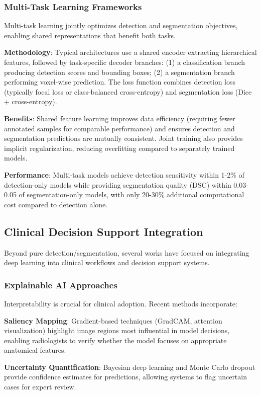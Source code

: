 \documentclass[conference]{IEEEtran}
\begin{document}
\subsubsection{Multi-Task Learning Frameworks}
Multi-task learning jointly optimizes detection and segmentation objectives, enabling shared representations that benefit both tasks.

\textbf{Methodology}: Typical architectures use a shared encoder extracting hierarchical features, followed by task-specific decoder branches: (1) a classification branch producing detection scores and bounding boxes; (2) a segmentation branch performing voxel-wise prediction. The loss function combines detection loss (typically focal loss or class-balanced cross-entropy) and segmentation loss (Dice + cross-entropy).

\textbf{Benefits}: Shared feature learning improves data efficiency (requiring fewer annotated samples for comparable performance) and ensures detection and segmentation predictions are mutually consistent. Joint training also provides implicit regularization, reducing overfitting compared to separately trained models.

\textbf{Performance}: Multi-task models achieve detection sensitivity within 1-2\% of detection-only models while providing segmentation quality (DSC) within 0.03-0.05 of segmentation-only models, with only 20-30\% additional computational cost compared to detection alone.

\subsection{Clinical Decision Support Integration}

Beyond pure detection/segmentation, several works have focused on integrating deep learning into clinical workflows and decision support systems.

\subsubsection{Explainable AI Approaches}
Interpretability is crucial for clinical adoption. Recent methods incorporate:

\textbf{Saliency Mapping}: Gradient-based techniques (GradCAM, attention visualization) highlight image regions most influential in model decisions, enabling radiologists to verify whether the model focuses on appropriate anatomical features.

\textbf{Uncertainty Quantification}: Bayesian deep learning and Monte Carlo dropout provide confidence estimates for predictions, allowing systems to flag uncertain cases for expert review.
\end{document}
